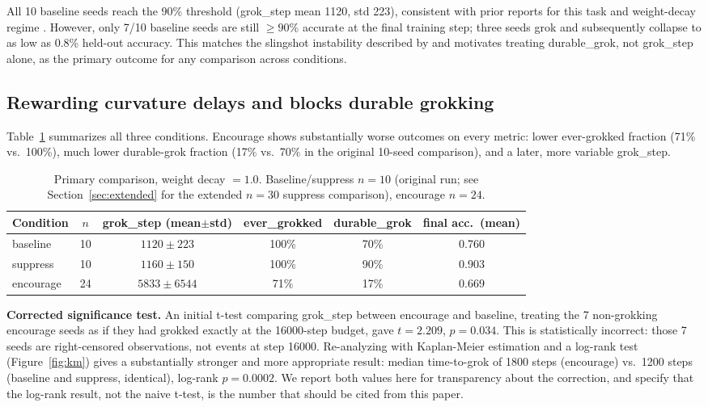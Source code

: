 \documentclass[11pt]{article}
\begin{document}
All 10 baseline seeds reach the 90\% threshold (grok\_step mean 1120,
std 223), consistent with prior reports for this task and weight-decay
regime \citep{power2022grokking}. However, only 7/10 baseline seeds are
still $\geq 90\%$ accurate at the final training step; three seeds grok
and subsequently collapse to as low as 0.8\% held-out accuracy. This
matches the slingshot instability described by \citet{thilak2022slingshot}
and motivates treating durable\_grok, not grok\_step alone, as the primary
outcome for any comparison across conditions.

\subsection{Rewarding curvature delays and blocks durable grokking}

Table~\ref{tab:main} summarizes all three conditions. Encourage shows
substantially worse outcomes on every metric: lower ever-grokked fraction
(71\% vs.\ 100\%), much lower durable-grok fraction (17\% vs.\ 70\% in the
original 10-seed comparison), and a later, more variable grok\_step.

\begin{table}[t]
\centering
\small
\caption{Primary comparison, weight decay $=1.0$. Baseline/suppress $n=10$
(original run; see Section~\ref{sec:extended} for the extended $n=30$
suppress comparison), encourage $n=24$.}
\label{tab:main}
\begin{tabular}{lccccc}
\toprule
Condition & $n$ & grok\_step (mean$\pm$std) & ever\_grokked & durable\_grok & final acc.\ (mean) \\
\midrule
baseline  & 10 & $1120 \pm 223$  & 100\% & 70\% & 0.760 \\
suppress  & 10 & $1160 \pm 150$  & 100\% & 90\% & 0.903 \\
encourage & 24 & $5833 \pm 6544$ & 71\%  & 17\% & 0.669 \\
\bottomrule
\end{tabular}
\end{table}

\textbf{Corrected significance test.} An initial t-test comparing
grok\_step between encourage and baseline, treating the 7 non-grokking
encourage seeds as if they had grokked exactly at the 16000-step budget,
gave $t=2.209$, $p=0.034$. This is statistically incorrect: those 7 seeds
are right-censored observations, not events at step 16000. Re-analyzing
with Kaplan-Meier estimation and a log-rank test (Figure~\ref{fig:km})
gives a substantially stronger and more appropriate result: median
time-to-grok of 1800 steps (encourage) vs.\ 1200 steps (baseline and
suppress, identical), log-rank $p=0.0002$. We report both values here for
transparency about the correction, and specify that the log-rank result,
not the naive t-test, is the number that should be cited from this paper.
\end{document}

